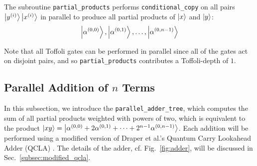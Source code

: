 \documentclass[reprint,amsmath,amssymb,aps,pra]{revtex4-2}
\newcommand{\smallket}[1]{{|{#1}\rangle}}
\begin{document}

The subroutine \texttt{partial\_products} performs \texttt{conditional\_copy} on
all pairs $\ket{y^{(i)}}\ket{x^{(i)}}$ in parallel to produce all partial
products of $\ket{x}$ and $\ket{y}$:
\begin{align}
    \ket{\alpha^{(0,0)}},\ket{\alpha^{(0,1)}},\dots,\ket{\alpha^{(0,n-1)}}
\end{align}


 \begin{algorithm}[h]
 \caption{partial\_products}
 \label{algo:itwopowermultiples}
 \KwIn{
 $\smallket{y^{(0)}}
\!\cdot\!\cdot\!\cdot\!
 \smallket{y^{(n-1)}}
 \smallket{x^{(0)}}
\!\cdot\!\cdot\!\cdot\!
 \smallket{x^{(n-1)}}\smallket{0^{(0)}}
\!\cdot\!\cdot\!\cdot\!
 \smallket{0^{(n-1)}}$
 }
 \end{algorithm}

Note that all Toffoli gates can be performed in parallel since all of the gates act on disjoint pairs, and so 
\texttt{partial\_products} contributes a Toffoli-depth of $1$.


\subsection{Parallel Addition of $n$ Terms}\label{subsec:add}

In this subsection, we introduce the \texttt{parallel\_adder\_tree}, which
computes the sum of all partial products weighted with powers of two, which is equivalent to the product
$\ket{xy} = \ket{\alpha^{(0,0)} + 2\alpha^{(0,1)}+\dots + 2^{n-1}\alpha^{(0,n-1)}}$. 
Each addition will be performed using a modified version of Draper et al.'s Quantum Carry Lookahead Adder (QCLA) \cite{Draper2004}.
The details of the adder, cf. Fig.~\ref{fig:adder}, will be discussed in Sec.~\ref{subsec:modified_qcla}.
\end{document}
